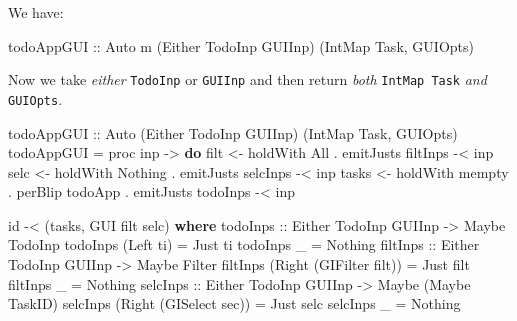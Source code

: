 \documentclass[]{article}
\newenvironment{Shaded}{}{}
\newcommand{\DataTypeTok}[1]{\textcolor[rgb]{0.56,0.13,0.00}{#1}}
\newcommand{\FunctionTok}[1]{\textcolor[rgb]{0.02,0.16,0.49}{#1}}
\newcommand{\KeywordTok}[1]{\textcolor[rgb]{0.00,0.44,0.13}{\textbf{#1}}}
\newcommand{\NormalTok}[1]{#1}
\newcommand{\OperatorTok}[1]{\textcolor[rgb]{0.40,0.40,0.40}{#1}}
\newcommand{\OtherTok}[1]{\textcolor[rgb]{0.00,0.44,0.13}{#1}}
\begin{document}
We have:

\begin{Shaded}
\begin{Highlighting}[]
\OtherTok{todoAppGUI ::} \DataTypeTok{Auto}\NormalTok{ m (}\DataTypeTok{Either} \DataTypeTok{TodoInp} \DataTypeTok{GUIInp}\NormalTok{) (}\DataTypeTok{IntMap} \DataTypeTok{Task}\NormalTok{, }\DataTypeTok{GUIOpts}\NormalTok{)}
\end{Highlighting}
\end{Shaded}

Now we take \emph{either} \texttt{TodoInp} or \texttt{GUIInp} and then return
\emph{both} \texttt{IntMap\ Task} \emph{and} \texttt{GUIOpts}.

\begin{Shaded}
\begin{Highlighting}[]
\OtherTok{todoAppGUI ::} \DataTypeTok{Auto\textquotesingle{}}\NormalTok{ (}\DataTypeTok{Either} \DataTypeTok{TodoInp} \DataTypeTok{GUIInp}\NormalTok{) (}\DataTypeTok{IntMap} \DataTypeTok{Task}\NormalTok{, }\DataTypeTok{GUIOpts}\NormalTok{)}
\NormalTok{todoAppGUI }\OtherTok{=}\NormalTok{ proc inp }\OtherTok{{-}>} \KeywordTok{do}
\NormalTok{    filt  }\OtherTok{<{-}}\NormalTok{ holdWith }\DataTypeTok{All}                      \OperatorTok{.}\NormalTok{ emitJusts filtInps }\OperatorTok{{-}<}\NormalTok{ inp}
\NormalTok{    selc  }\OtherTok{<{-}}\NormalTok{ holdWith }\DataTypeTok{Nothing}                  \OperatorTok{.}\NormalTok{ emitJusts selcInps }\OperatorTok{{-}<}\NormalTok{ inp}
\NormalTok{    tasks }\OtherTok{<{-}}\NormalTok{ holdWith }\FunctionTok{mempty} \OperatorTok{.}\NormalTok{ perBlip todoApp }\OperatorTok{.}\NormalTok{ emitJusts todoInps }\OperatorTok{{-}<}\NormalTok{ inp}

    \FunctionTok{id} \OperatorTok{{-}<}\NormalTok{ (tasks, }\DataTypeTok{GUI}\NormalTok{ filt selc)}
  \KeywordTok{where}
\OtherTok{    todoInps ::} \DataTypeTok{Either} \DataTypeTok{TodoInp} \DataTypeTok{GUIInp} \OtherTok{{-}>} \DataTypeTok{Maybe} \DataTypeTok{TodoInp}
\NormalTok{    todoInps (}\DataTypeTok{Left}\NormalTok{ ti) }\OtherTok{=} \DataTypeTok{Just}\NormalTok{ ti}
\NormalTok{    todoInps \_         }\OtherTok{=} \DataTypeTok{Nothing}
\OtherTok{    filtInps ::} \DataTypeTok{Either} \DataTypeTok{TodoInp} \DataTypeTok{GUIInp} \OtherTok{{-}>} \DataTypeTok{Maybe} \DataTypeTok{Filter}
\NormalTok{    filtInps (}\DataTypeTok{Right}\NormalTok{ (}\DataTypeTok{GIFilter}\NormalTok{ filt)) }\OtherTok{=} \DataTypeTok{Just}\NormalTok{ filt}
\NormalTok{    filtInps \_                       }\OtherTok{=} \DataTypeTok{Nothing}
\OtherTok{    selcInps ::} \DataTypeTok{Either} \DataTypeTok{TodoInp} \DataTypeTok{GUIInp} \OtherTok{{-}>} \DataTypeTok{Maybe}\NormalTok{ (}\DataTypeTok{Maybe} \DataTypeTok{TaskID}\NormalTok{)}
\NormalTok{    selcInps (}\DataTypeTok{Right}\NormalTok{ (}\DataTypeTok{GISelect}\NormalTok{ sec))  }\OtherTok{=} \DataTypeTok{Just}\NormalTok{ selc}
\NormalTok{    selcInps \_                       }\OtherTok{=} \DataTypeTok{Nothing}
\end{Highlighting}
\end{Shaded}
\end{document}
